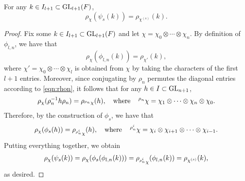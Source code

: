 
    \begin{lemma}\label{lem_compatible-rho}
        For any $k\in I_{l+1}\subset\mathrm{GL}_{l+1}(F)$, 
        $$\rho_\chi(\psi_s(k))=\rho_{\chi^{(s)}}(k).$$
    \end{lemma}
    \begin{proof}
        Fix some $k\in I_{l+1}\subset\mathrm{GL}_{l+1}(F)$ and let $\chi=\chi_0\otimes\cdots\otimes\chi_n$.
        By definition of $\phi_{l,n}$, we have that
        $$\rho_\chi(\phi_{l,n}(k))=\rho_{\chi'}(k),$$
        where $\chi'=\chi_0\otimes\cdots\otimes\chi_l$ is obtained from $\chi$ by taking the characters of the first $l+1$ entries. Moreover, since conjugating by $\rho_n$ permutes the diagonal entries according to \eqref{eqn:rhon}, it follows that for any $h\in I\subset\mathrm{GL}_{n+1}$, 
        $$\rho_\chi(\rho_n^{-1}h\rho_n)=\rho_{\prescript{\rho_n}{}{\chi}}(h),\quad\text{where}\quad\prescript{\rho_n}{}{\chi}=\chi_1\otimes\cdots\otimes\chi_n\otimes\chi_0.$$
        Therefore, by the construction of $\phi_s$, we have that 
        $$\rho_\chi(\phi_s(h))=\rho_{\prescript{\rho_n^i}{}{\chi}}(h),\quad\text{where}\quad\prescript{\rho_n^i}{}{\chi}=\chi_i\otimes\chi_{i+1}\otimes\cdots\otimes\chi_{i-1}.$$
        Putting everything together, we obtain
        $$\rho_\chi(\psi_s(k))=\rho_\chi(\phi_s(\phi_{l,n}(k)))=\rho_{\prescript{\rho_n^i}{}{\chi}}(\phi_{l,n}(k))=\rho_{\chi^{(s)}}(k),$$
        as desired.
    \end{proof}

